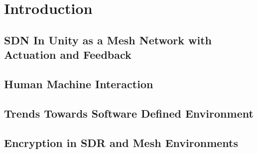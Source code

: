 
\chapter{Introduction} %

\label{Chapter1} %


\newcommand{\keyword}[1]{\textbf{#1}}
\newcommand{\tabhead}[1]{\textbf{#1}}
\newcommand{\code}[1]{\texttt{#1}}
\newcommand{\file}[1]{\texttt{\bfseries#1}}
\newcommand{\option}[1]{\texttt{\itshape#1}}


\section{SDN In Unity as a Mesh Network with Actuation and Feedback}


\section{Human Machine Interaction}


\section{Trends Towards Software Defined Environment}


\section{Encryption in SDR and Mesh Environments}





